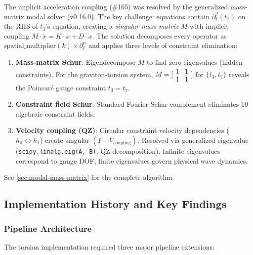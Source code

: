 The implicit acceleration coupling (\#165) was resolved by the generalized mass-matrix modal solver (v0.16.0). The key challenge: equations contain $\partial_t^2(t_7)$ on the RHS of $t_3$'s equation, creating a \emph{singular mass matrix} $M$ with implicit coupling $M \cdot \ddot{x} = K \cdot x + D \cdot \dot{x}$. The solution decomposes every operator as $\text{spatial\_multiplier}(k) \times \partial_t^n$ and applies three levels of constraint elimination:
\begin{enumerate}
  \item \textbf{Mass-matrix Schur}: Eigendecompose $M$ to find zero eigenvalues (hidden constraints). For the graviton-torsion system, $M = \bigl[\begin{smallmatrix} 1 & 1 \\ 1 & 1 \end{smallmatrix}\bigr]$ for $\{t_3, t_7\}$ reveals the Poincar\'e gauge constraint $t_3 = t_7$.
  \item \textbf{Constraint field Schur}: Standard Fourier Schur complement eliminates 10 algebraic constraint fields.
  \item \textbf{Velocity coupling (QZ)}: Circular constraint velocity dependencies ($h_0 \leftrightarrow h_1$) create singular $(I - V_\text{coupling})$. Resolved via generalized eigenvalue (\texttt{scipy.linalg.eig(A, B)}, QZ decomposition). Infinite eigenvalues correspond to gauge DOF; finite eigenvalues govern physical wave dynamics.
\end{enumerate}
See \cref{sec:modal-mass-matrix} for the complete algorithm.

\subsection{Implementation History and Key Findings}
\label{sec:torsion-history}

\subsubsection{Pipeline Architecture}

The torsion implementation required three major pipeline extensions:

